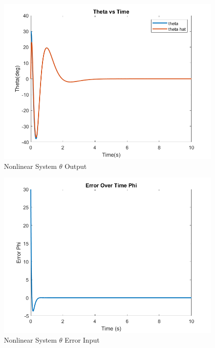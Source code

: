 \begin{figure}[!ht]
    \centering
    \includegraphics[width=\linewidth]{figs/of_nlin_theta.png}
    \caption{Nonlinear System $\theta$ Output}
    \label{}
\end{figure}

\begin{figure}[!ht]
    \centering
    \includegraphics[width=\linewidth]{figs/of_nlin_theta_err.png}
    \caption{Nonlinear System $\theta$ Error Input}
    \label{}
\end{figure}


